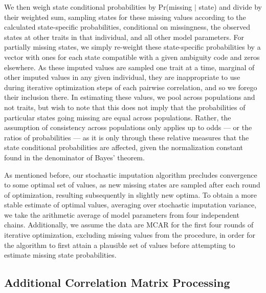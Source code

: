We then weigh state conditional probabilities by Pr(missing $\vert$ state) and divide by their weighted sum, sampling states for these missing values according to the calculated state-specific probabilities, conditional on missingness, the observed states at other traits in that individual, and all other model parameters. For partially missing states, we simply re-weight these state-specific probabilities by a vector with ones for each state compatible with a given ambiguity code and zeros elsewhere. As these imputed values are sampled one trait at a time, marginal of other imputed values in any given individual, they are inappropriate to use during iterative optimization steps of each pairwise correlation, and so we forego their inclusion there. In estimating these values, we pool across populations and not traits, but wish to note that this does not imply that the probabilities of particular states going missing are equal across populations. Rather, the assumption of consistency across populations only applies up to odds --- or the ratios of probabilities --- as it is only through these relative measures that the state conditional probabilities are affected, given the normalization constant found in the denominator of Bayes' theorem.

As mentioned before, our stochastic imputation algorithm precludes convergence to some optimal set of values, as new missing states are sampled after each round of optimization, resulting subsequently in slightly new optima. To obtain a more stable estimate of optimal values, averaging over stochastic imputation variance, we take the arithmetic average of model parameters from four independent chains. Additionally, we assume the data are MCAR for the first four rounds of iterative optimization, excluding missing values from the procedure, in order for the algorithm to first attain a plausible set of values before attempting to estimate missing state probabilities. 

\subsection{Additional Correlation Matrix Processing}

